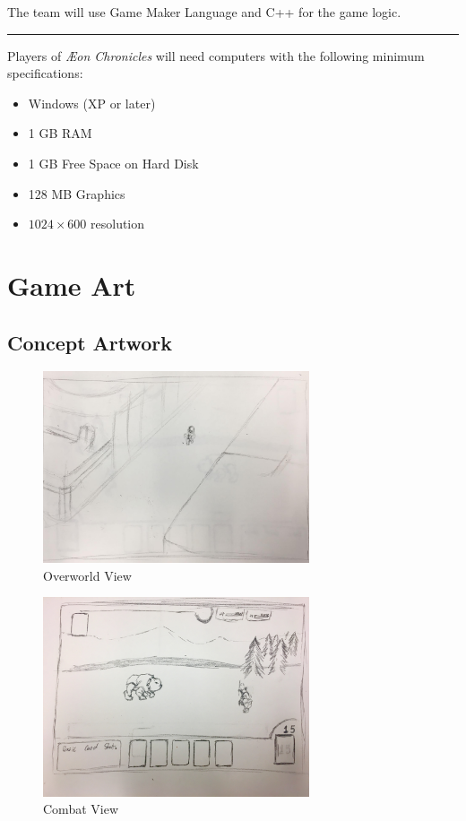 \documentclass[12pt,titlepage]{article}
\newcommand\gametitle{\textit{\AE on Chronicles}\xspace}
\newcommand\sep{\rule{2.5in}{0.1mm}}
\begin{document}
The team will use Game Maker Language and C++ for the game logic.

\sep

Players of \gametitle will need computers with the following minimum
specifications:

\begin{itemize}
    \item Windows (XP or later)
    \item 1 GB RAM
    \item 1 GB Free Space on Hard Disk
    \item 128 MB Graphics
    \item $1024 \times 600$ resolution
\end{itemize}

\newpage
\section{Game Art}
%

\subsection{Concept Artwork}\label{sec:concept_art}

\begin{figure}[H]
    \caption{Overworld View}
    \label{fig:overview}
    \centering
    \includegraphics[width=0.7\textwidth]{../../graphics/overview}
\end{figure}

\begin{figure}[H]
    \caption{Combat View}
    \label{fig:combat}
    \centering
    \includegraphics[width=0.7\textwidth]{../../graphics/combat}
\end{figure}
\end{document}
